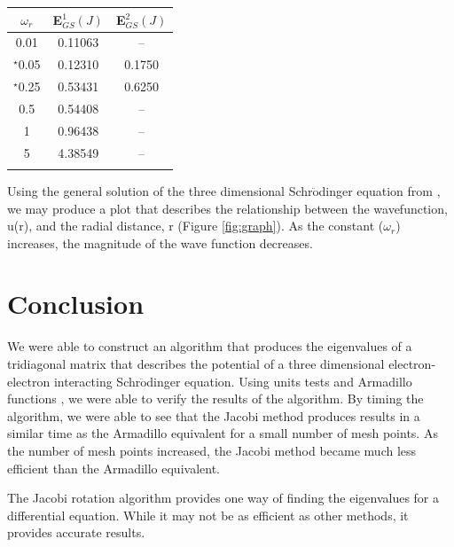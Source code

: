 \documentclass[%
reprint,
superscriptaddress,
showpacs,
nofootinbib,
bibnotes,amsmath,amssymb,aps,
prc, 
]{revtex4-1}
\begin{document}
	
	
	\begin{center}
		\begin{tabular}{ccc}
			\hline \hline
			$\omega_{r}$ &  E$_{GS}^{1} (J)$ & E$_{GS}^{2} (J)$ \cite{PhysRevA.48.3561}\\
			\hline
			0.01 & 0.11063 & -- \\
			$^{\star}$0.05 & 0.12310 & 0.1750\\
			$^{\star}$0.25 & 0.53431 & 0.6250\\
			0.5 & 0.54408 & --\\
			1 & 0.96438 & -- \\
			5 & 4.38549 & --\\
			\hline
			\label{StateTable}
		\end{tabular}
	\end{center}
	
	Using the general solution of the three dimensional Schr$\ddot{\textrm{o}}$dinger equation from \cite{PhysRevA.48.3561}, we may produce a plot that describes the relationship between the wavefunction, u(r), and the radial distance, r (Figure \ref{fig:graph}).  As the constant ($\omega_{r}$) increases, the magnitude of the wave function decreases.
	
	
	
	
	
	
	\section{Conclusion}
	
	We were able to construct an algorithm that produces the eigenvalues of a tridiagonal matrix that describes the potential of a three dimensional electron-electron interacting Schr$\ddot{\textrm{o}}$dinger equation.  Using units tests and Armadillo functions \cite{Armadillo}, we were able to verify the results of the algorithm.  By timing the algorithm, we were able to see that the Jacobi method produces results in a similar time as the Armadillo equivalent for a small number of mesh points.  As the number of mesh points increased, the Jacobi method became much less efficient than the Armadillo equivalent.
	
	The Jacobi rotation algorithm provides one way of finding the eigenvalues for a differential equation.  While it may not be as efficient as other methods, it provides accurate results.
	
	
	
	
	
	
		
	
	
	
\end{document}
